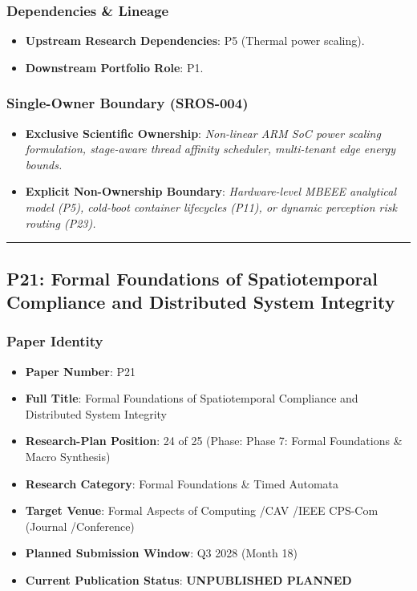 \documentclass[11pt,letterpaper]{article}
\begin{document}
\subsubsection{Dependencies \& Lineage}
\begin{itemize}[leftmargin=*]
    \item \textbf{Upstream Research Dependencies}: P5 (Thermal power scaling).
    \item \textbf{Downstream Portfolio Role}: P1.
\end{itemize}

\subsubsection{Single-Owner Boundary (SROS-004)}
\begin{itemize}[leftmargin=*]
    \item \textbf{Exclusive Scientific Ownership}: \textit{Non-\allowbreak linear ARM SoC power scaling formulation, stage-\allowbreak aware thread affinity scheduler, multi-\allowbreak tenant edge energy bounds.}
    \item \textbf{Explicit Non-Ownership Boundary}: \textit{Hardware-\allowbreak level MBEEE analytical model (P5), cold-\allowbreak boot container lifecycles (P11), or dynamic perception risk routing (P23).}
\end{itemize}

\vspace{0.4cm}
\hrule

\subsection{P21: Formal Foundations of Spatiotemporal Compliance and Distributed System Integrity}
\label{sec:profile_p21}

\subsubsection{Paper Identity}
\begin{itemize}[leftmargin=*]
    \item \textbf{Paper Number}: P21
    \item \textbf{Full Title}: Formal Foundations of Spatiotemporal Compliance and Distributed System Integrity
    \item \textbf{Research-Plan Position}: 24 of 25 (Phase: Phase 7: Formal Foundations \& Macro Synthesis)
    \item \textbf{Research Category}: Formal Foundations \& Timed Automata
    \item \textbf{Target Venue}: Formal Aspects of Computing /\allowbreak  CAV /\allowbreak  IEEE CPS-\allowbreak Com (Journal /\allowbreak  Conference)
    \item \textbf{Planned Submission Window}: Q3 2028 (Month 18)
    \item \textbf{Current Publication Status}: \textbf{UNPUBLISHED PLANNED}
\end{itemize}
\end{document}
